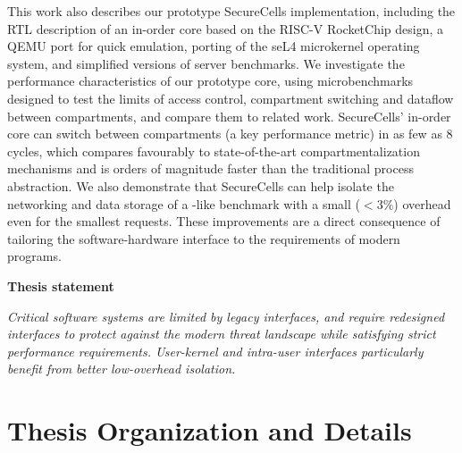 This work also describes our prototype SecureCells implementation, including
the RTL description of an in-order core based on the RISC-V RocketChip design,
a QEMU port for quick emulation, porting of the seL4 microkernel operating
system, and simplified versions of server benchmarks.
We investigate the performance characteristics of our prototype core, using
microbenchmarks designed to test the limits of access control, compartment 
switching and dataflow between compartments, and compare them to related work.
SecureCells' in-order core can switch between compartments (a key performance
metric) in as few as 8 cycles, which compares favourably to state-of-the-art
compartmentalization mechanisms and is orders of magnitude faster than the
traditional process abstraction.
We also demonstrate that SecureCells can help isolate the networking and
data storage of a -like benchmark with a small ($<3\%$)
overhead even for the smallest requests.
These improvements are a direct consequence of tailoring the software-hardware
interface to the requirements of modern programs.


\begin{center}
      \textbf{Thesis statement}


\emph{
      Critical software systems are limited by legacy interfaces, 
      and require redesigned interfaces to protect against the modern 
      threat landscape while satisfying strict performance requirements.
      User-kernel and intra-user interfaces particularly benefit from 
      better low-overhead isolation.
}
\end{center}


\section{Thesis Organization and Details}

